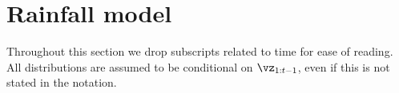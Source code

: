 \documentclass[12pt]{article}
\begin{document}








\clearpage %
\appendix
\section{Rainfall model}\label{sec:rainfall_appendix}
Throughout this section we drop subscripts related to time for ease of reading.
All distributions are assumed to be conditional on $\vz_{1:t-1}$, even if this
is not stated in the notation.
\end{document}
